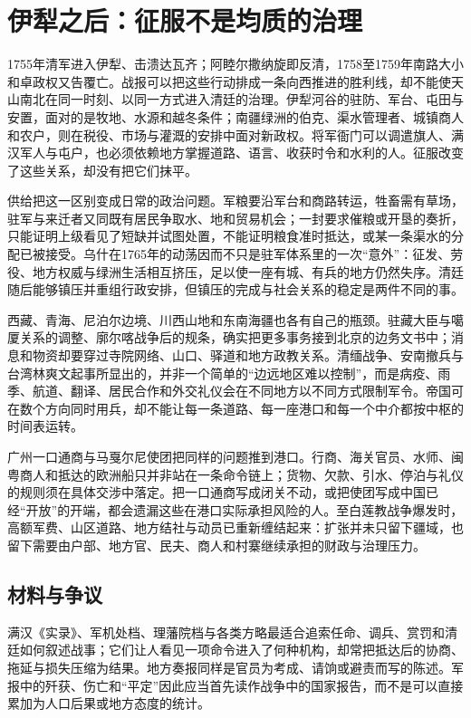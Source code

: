 \section{伊犁之后：征服不是均质的治理}

1755年清军进入伊犁、击溃达瓦齐；阿睦尔撒纳旋即反清，1758至1759年南路大小和卓政权又告覆亡。战报可以把这些行动排成一条向西推进的胜利线，却不能使天山南北在同一时刻、以同一方式进入清廷的治理。伊犁河谷的驻防、军台、屯田与安置，面对的是牧地、水源和越冬条件；南疆绿洲的伯克、渠水管理者、城镇商人和农户，则在税役、市场与灌溉的安排中面对新政权。将军衙门可以调遣旗人、满汉军人与屯户，也必须依赖地方掌握道路、语言、收获时令和水利的人。征服改变了这些关系，却没有把它们抹平。

供给把这一区别变成日常的政治问题。军粮要沿军台和商路转运，牲畜需有草场，驻军与来迁者又同既有居民争取水、地和贸易机会；一封要求催粮或开垦的奏折，只能证明上级看见了短缺并试图处置，不能证明粮食准时抵达，或某一条渠水的分配已被接受。乌什在1765年的动荡因而不只是驻军体系里的一次“意外”：征发、劳役、地方权威与绿洲生活相互挤压，足以使一座有城、有兵的地方仍然失序。清廷随后能够镇压并重组行政安排，但镇压的完成与社会关系的稳定是两件不同的事。

西藏、青海、尼泊尔边境、川西山地和东南海疆也各有自己的瓶颈。驻藏大臣与噶厦关系的调整、廓尔喀战争后的规条，确实把更多事务接到北京的边务文书中；消息和物资却要穿过寺院网络、山口、驿道和地方政教关系。清缅战争、安南撤兵与台湾林爽文起事所显出的，并非一个简单的“边远地区难以控制”，而是病疫、雨季、航道、翻译、居民合作和外交礼仪会在不同地方以不同方式限制军令。帝国可在数个方向同时用兵，却不能让每一条道路、每一座港口和每一个中介都按中枢的时间表运转。

广州一口通商与马戛尔尼使团把同样的问题推到港口。行商、海关官员、水师、闽粤商人和抵达的欧洲船只并非站在一条命令链上；货物、欠款、引水、停泊与礼仪的规则须在具体交涉中落定。把一口通商写成闭关不动，或把使团写成中国已经“开放”的开端，都会遗漏这些在港口实际承担风险的人。至白莲教战争爆发时，高额军费、山区道路、地方结社与动员已重新缠结起来：扩张并未只留下疆域，也留下需要由户部、地方官、民夫、商人和村寨继续承担的财政与治理压力。

\subsection{材料与争议}

满汉《实录》、军机处档、理藩院档与各类方略最适合追索任命、调兵、赏罚和清廷如何叙述战事；它们让人看见一项命令进入了何种机构，却常把抵达后的协商、拖延与损失压缩为结果。地方奏报同样是官员为考成、请饷或避责而写的陈述。军报中的歼获、伤亡和“平定”因此应当首先读作战争中的国家报告，而不是可以直接累加为人口后果或地方态度的统计。


